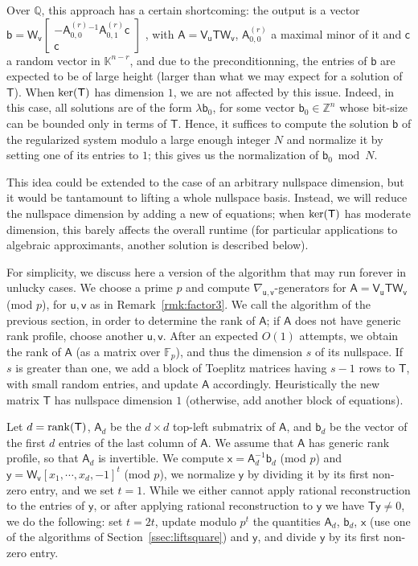 \documentclass[sigconf]{acmart}
\newcommand{\vb}{\ensuremath{\mathsf{b}}}
\newcommand{\vc}{\ensuremath{\mathsf{c}}}
\newcommand{\vu}{\ensuremath{\mathsf{u}}}
\newcommand{\vv}{\ensuremath{\mathsf{v}}}
\newcommand{\vx}{\ensuremath{\mathsf{x}}}
\newcommand{\vy}{\ensuremath{\mathsf{y}}}
\newcommand{\mA}{\ensuremath{\mathsf{A}}}
\newcommand{\mT}{\ensuremath{\mathsf{T}}}
\newcommand{\mV}{\ensuremath{\mathsf{V}}}
\newcommand{\mW}{\ensuremath{\mathsf{W}}}
\newcommand{\K}{\ensuremath{\mathbb{K}}}
\newcommand{\Q}{\ensuremath{\mathbb{Q}}}
\newcommand{\Z}{\ensuremath{\mathbb{Z}}}
\theoremstyle{acmdefinition}
\begin{document}
Over $\Q$, this approach has a certain shortcoming: the output is a
vector
%
$\vb=\mW_{\vv}
\left[\begin{smallmatrix} 
-\mA^{(r)}_{0,0}{}^{-1} \mA^{(r)}_{0,1} \vc \\ 
\vc
\end{smallmatrix}\right]$
%
, with $\mA=\mV_\vu \mT \mW_{\vv}$, $\mA^{(r)}_{0,0}$ a maximal minor
of it and $\vc$ a random vector in $\K^{n-r}$, and due to the
preconditionning, the entries of $\vb$ are expected to be of large
height (larger than what we may expect for a solution of $\mT$). When
${\rm ker}(\mT)$ has dimension $1$, we are not affected by this
issue. Indeed, in this case, all solutions are of the form
$\lambda \vb_0$, for some vector $\vb_0 \in \Z^n$ whose bit-size can
be bounded only in terms of $\mT$. Hence, it suffices to compute the
solution $\vb$ of the regularized system modulo a large enough integer
$N$ and normalize it by setting one of its entries to $1$; this gives
us the normalization of $\vb_0 \bmod N$.

This idea could be extended to the case of an arbitrary nullspace
dimension, but it would be tantamount to lifting a whole nullspace
basis. Instead, we will reduce the nullspace dimension by adding a new
of equations; when ${\rm ker}(\mT)$ has moderate dimension, this
barely affects the overall runtime (for particular applications to
algebraic approximants, another solution is described below).

For simplicity, we discuss here a version of the algorithm that may
run forever in unlucky cases. We choose a prime $p$ and compute
$\nabla_{\vu,\vv}$-generators for $\mA = \mV_\vu \mT \mW_{\vv}$ (mod
$p$), for $\vu,\vv$ as in Remark~\ref{rmk:factor3}. We call the
algorithm of the previous section, in order to determine the rank of
$\mA$; if $\mA$ does not have generic rank profile, choose another
$\vu,\vv$. After an expected $O(1)$ attempts, we obtain the rank of
$\mA$ (as a matrix over $\mathbb{F}_p$), and thus the dimension $s$ of
its nullspace. If $s$ is greater than one, we add a block of Toeplitz
matrices having $s-1$ rows to $\mT$, with small random entries, and
update $\mA$ accordingly. Heuristically the new matrix $\mT$ has
nullspace dimension $1$ (otherwise, add another block of equations).

Let $d={\rm rank}(\mT)$, $\mA_{d}$ be the $d \times d$ top-left
submatrix of $\mA$, and $\vb_d$ be the vector of the first $d$ entries
of the last column of $\mA$. We assume that $\mA$ has generic rank
profile, so that $\mA_{d}$ is invertible.  We compute
$\vx = \mA_d^{-1} \vb_d$ (mod $p$) and
$\vy = \mW_\vv [x_1, \cdots, x_d, -1]^t$ (mod $p$), we normalize $\vy$
by dividing it by its first non-zero entry, and we set $t=1$.  While
we either cannot apply rational reconstruction to the entries of
$\vy$, or after applying rational reconstruction to $\vy$ we have
$\mT \vy \ne 0$, we do the following: set $t = 2t$, update modulo
$p^t$ the quantities $\mA_{d}$, $\vb_d$, $\vx$ (use one of the
algorithms of Section~\ref{ssec:liftsquare}) and $\vy$, and divide
$\vy$ by its first non-zero entry.
\end{document}
